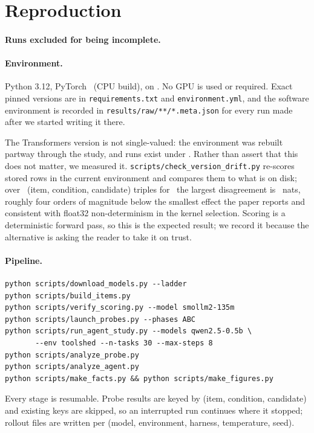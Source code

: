 \section{Reproduction}
\label{app:repro}

\paragraph{Runs excluded for being incomplete.}


\paragraph{Environment.}
Python 3.12, PyTorch \TorchVersion\ (CPU build), on \CPUName. No GPU is used or
required. Exact pinned versions are in \texttt{requirements.txt} and
\texttt{environment.yml}, and the software environment is recorded in
\texttt{results/raw/**/*.meta.json} for every run made after we started writing
it there.

The Transformers version is not single-valued: the environment was rebuilt
partway through the study, and runs exist under \TransformersVersions. Rather
than assert that this does not matter, we measured it.
\texttt{scripts/check\_version\_drift.py} re-scores stored rows in the current
environment and compares them to what is on disk; over \DriftChecked\
(item, condition, candidate) triples for \DriftModel\ the largest disagreement
is \DriftMax\ nats, roughly four orders of magnitude below the smallest effect
the paper reports and consistent with float32 non-determinism in the kernel
selection. Scoring is a deterministic forward pass, so this is the expected
result; we record it because the alternative is asking the reader to take it on
trust.

\paragraph{Pipeline.}
\begin{verbatim}
python scripts/download_models.py --ladder
python scripts/build_items.py
python scripts/verify_scoring.py --model smollm2-135m
python scripts/launch_probes.py --phases ABC
python scripts/run_agent_study.py --models qwen2.5-0.5b \
       --env toolshed --n-tasks 30 --max-steps 8
python scripts/analyze_probe.py
python scripts/analyze_agent.py
python scripts/make_facts.py && python scripts/make_figures.py
\end{verbatim}

Every stage is resumable. Probe results are keyed by
(item, condition, candidate) and existing keys are skipped, so an interrupted
run continues where it stopped; rollout files are written per
(model, environment, harness, temperature, seed).

